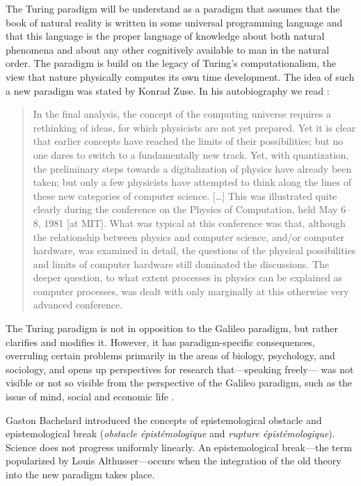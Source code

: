 \documentclass[pdftex,12pt]{article}
\begin{document}
The Turing paradigm will be understand as a paradigm that assumes that the book of natural reality is written in some universal programming language  and that this language is the proper language of knowledge about both natural phenomena and about any other cognitively available to man in the natural order. The paradigm is build on the legacy of Turing's computationalism, the view that nature physically computes its own time development. The idea of such a new paradigm was stated by Konrad Zuse. In his autobiography we read \parencite[p.63--64]{Zuse2012a}: \begin{quote} \small In the final analysis, the concept of the computing universe requires a rethinking of ideas, for which physicists are not yet prepared. Yet it is clear that earlier concepts have reached the limits of their possibilities; but no one dares to switch to a fundamentally new track. Yet, with quantization, the preliminary steps towards a digitalization of physics have already been taken; but only a few physicists have attempted to think along the lines of these new categories of computer science. [\dots] This was illustrated quite clearly during the conference on the Physics of Computation, held May 6--8, 1981 [at MIT]. What was typical at this conference was that, although the relationship between physics and computer science, and/or computer hardware, was examined in detail, the questions of the physical possibilities and limits of computer hardware still dominated the discussions. The
deeper question, to what extent processes in physics can be explained as computer processes, was dealt with only marginally at this otherwise very advanced conference. \end{quote}


The Turing paradigm is not in opposition to the Galileo paradigm, but rather clarifies and modifies it. However, it has paradigm-specific consequences, overruling certain problems primarily in the areas of biology, psychology, and sociology, and opens up perspectives for research that---speaking freely--- was not visible or not so visible from the perspective of the Galileo paradigm, such as the issue of mind, social and economic life \parencite[chapter 20]{MarciszewskiStacewicz2011}.


Gaston Bachelard \parencite*{Bachelard2002}  introduced the concepts of epistemological obstacle and epistemological break (\textit{obstacle épistémologique} and \textit{rupture épistémologique}). Science does not progress uniformly linearly. An epistemological break---the term popularized by Louis Althusser---occurs when the integration of the old theory into the new paradigm takes place.
\end{document}
